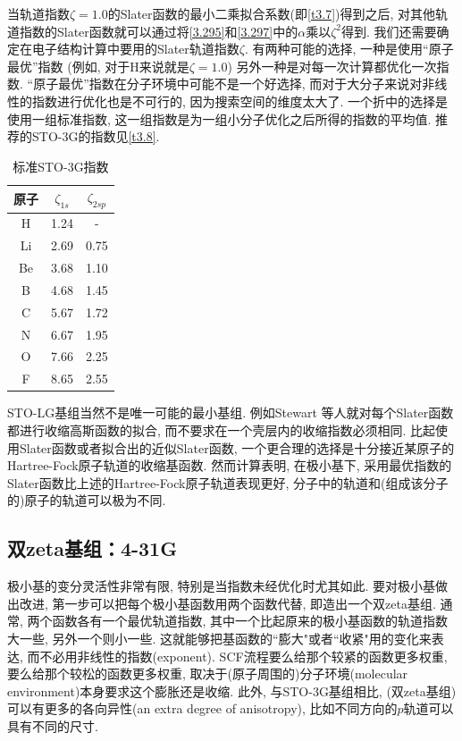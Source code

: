 当轨道指数$\zeta = 1.0$的Slater函数的最小二乘拟合系数(即\autoref{t3.7})得到之后, 
对其他轨道指数的Slater函数就可以通过将\autoref{3.295}和\autoref{3.297}中的$\alpha$乘以$\zeta^2$得到. 
我们还需要确定在电子结构计算中要用的Slater轨道指数$\zeta$. 
有两种可能的选择, 
一种是使用“原子最优”指数
(例如, 对于H来说就是$\zeta=1.0$)
另外一种是对每一次计算都优化一次指数. 
“原子最优”指数在分子环境中可能不是一个好选择, 
而对于大分子来说对非线性的指数进行优化也是不可行的, 
因为搜索空间的维度太大了. 
一个折中的选择是使用一组标准指数, 
这一组指数是为一组小分子优化之后所得的指数的平均值. 
推荐的STO-3G的指数见\autoref{t3.8}. 

\begin{table}[h]
	\centering\caption{标准STO-3G指数}
	\begin{tabular}{ccc}
		\hline
		原子&$\zeta_{1s}$&$\zeta_{2sp}$\\\hline
		H	 &1.24&-\\
		Li	 &2.69&0.75\\		
		Be	 &3.68&1.10\\
		B	 &4.68&1.45\\
		C	 &5.67&1.72\\
		N	 &6.67&1.95\\		
		O	 &7.66&2.25\\
		F	 &8.65&2.55\\
		\hline
	\end{tabular}
	\label{t3.8}
\end{table}

STO-LG基组当然不是唯一可能的最小基组. 
例如Stewart\endnote{
}
等人就对每个Slater函数都进行收缩高斯函数的拟合, 
而不要求在一个壳层内的收缩指数必须相同. 
比起使用Slater函数或者拟合出的近似Slater函数, 
一个更合理的选择是十分接近某原子的Hartree-Fock原子轨道的收缩基函数. 
然而计算表明, 
在极小基下, 
采用最优指数的Slater函数比上述的Hartree-Fock原子轨道表现更好, 
分子中的轨道和(组成该分子的)原子的轨道可以极为不同. 

\subsection{双zeta基组：4-31G}
极小基的变分灵活性非常有限, 特别是当指数未经优化时尤其如此. 
要对极小基做出改进, 第一步可以把每个极小基函数用两个函数代替, 即造出一个双zeta基组. 
通常, 两个函数各有一个最优轨道指数, 其中一个比起原来的极小基函数的轨道指数大一些, 另外一个则小一些. 
这就能够把基函数的``膨大"或者``收紧"用的变化来表达, 而不必用非线性的指数(exponent). 
SCF流程要么给那个较紧的函数更多权重, 要么给那个较松的函数更多权重, 
取决于(原子周围的)分子环境(molecular environment)本身要求这个膨胀还是收缩. 
此外, 与STO-3G基组相比, (双zeta基组)可以有更多的各向异性(an extra degree of anisotropy), 
比如不同方向的$p$轨道可以具有不同的尺寸. 


